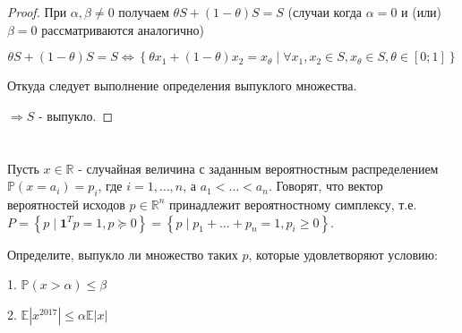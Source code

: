 \documentclass[a4paper,12pt]{article}
\newcommand{\lt}{\left}
\newcommand{\rt}{\right}
\begin{document}
\begin{proof}
При $\alpha,\beta \neq 0 $ получаем $\theta S + \lt(1 - \theta\rt)S=S$ (случаи когда $\alpha =0$ и (или) $\beta =0$ рассматриваются аналогично) 
 
\[
\theta S + \lt(1 - \theta\rt)S = S \Leftrightarrow \lt\{\theta x_1+\lt(1-\theta\rt)x_2 = x_\theta \mid \forall x_1,x_2 \in S,x_\theta \in S, \theta \in [0;1] \rt\}
\]

Откуда следует выполнение определения выпуклого множества.

$\Rightarrow S$ - выпукло.
 

\begin{comment}
Пусть $A = \alpha S$

$B = \beta S$

Тогда надо доказать, что $X + Y = Z - convex$

$Z = \left\{z \mid z = \alpha x + \beta y, x \in X, y \in Y, \alpha, \beta \in \mathbb{R}^1_+\right\}$
 
Возьмем две точки из $Z$: $z_1 = \alpha_1 x_1 + c_2 y_1, z_2 = c_1 x_2 + c_2 y_2$ и докажем, что отрезок между ними $\theta s_1 + (1 - \theta)s_2, \theta \in [0,1]$ так же принадлежит $S$
 
 $$\theta s_1 + (1 - \theta)s_2$$
 
 $$\theta (c_1 x_1 + c_2 y_1) + (1 - \theta)(c_1 x_2 + c_2 y_2)$$
 
 $$c_1 (\theta x_1 + (1 - \theta)x_2) + c_2 (\theta y_1 + (1 - \theta)y_2)$$
 
 $$c_1 x + c_2 y \in S$$
\end{comment}

	
\end{proof}

\section{}
Пусть $x \in \mathbb{R}$ - случайная величина с заданным вероятностным распределением $\mathbb{P}(x = a_i) = p_i$, где $i = 1, \ldots, n$, а $a_1 < \ldots < a_n$. Говорят, что вектор вероятностей исходов $p \in \mathbb{R}^n$ принадлежит вероятностному симплексу, т.е. $P = \left\{ p \mid \mathbf{1}^Tp = 1, p \succeq 0\right\} = \left\{ p \mid p_1 + \ldots + p_n = 1, p_i \ge 0 \right\}$. 

Определите, выпукло ли множество таких $p$, которые удовлетворяют условию:

1. $\mathbb{P}(x > \alpha) \le \beta$

2. $\mathbb{E} |x^{2017}| \le \alpha \mathbb{E}|x|$
\end{document}
